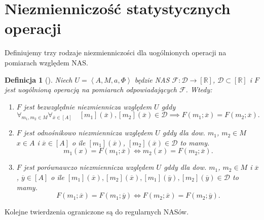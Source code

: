 \documentclass[12pt,a4paper]{report}
\newtheorem{definition}{Definicja}[chapter]
\newcommand{\domkniecie}[1]{\left[ {#1} \right] }
\newcommand{\tuple}[1]{\left\langle {#1} \right\rangle}
\begin{document}
\section{Niezmienniczość statystycznych operacji}
Definiujemy trzy rodzaje niezmienniczości dla uogólnionych operacji na pomiarach względem NAS. 
\begin{definition}[{\citep[Def. 5]{adams1965theory}}]
Niech $U=\tuple{A,M,a,\Phi}$ będzie NAS $\mathcal{F}:\mathcal{D}\to\domkniecie{\mathbb{R}}$, $\mathcal{D}\subset \domkniecie{\mathbb{R}}$ i $F$ jest uogólnioną operacją na pomiarach odpowiadających $\mathcal{F}$. Wtedy:
\begin{enumerate}
\item
$F$ jest bezwzględnie niezmiennicza względem $U$ gddy
$$
\forall_{m_{1}, m_{2} \in M}  \forall_{\overline{x} \in \domkniecie{A}} \quad \domkniecie{m_1}(\overline{x}), \domkniecie{m_2}(\overline{x})\in \mathcal{D} \implies F(m_{1};\overline{x})=F(m_{2};\overline{x}).
$$
\item
$F$ jest odnośnikowo niezmiennicza względem $U$ gddy dla dow. $m_{1}$, $m_{2} \in M$ $x \in A$ i  $\overline{x} \in \domkniecie{A}$ o ile  $\domkniecie{m_1}(\overline{x})$, $\domkniecie{m_2}(\overline{x})\in \mathcal{D}$ to mamy.
$$
 m_{1}(x)=F(m_{1};\overline{x}) \iff m_{2}(x)=F(m_{2};\overline{x}).
$$
\item
$F$ jest porównawczo niezmiennicza względem $U$ gddy dla dow. $m_1$, $m_2 \in M$ i $\overline{x}$, $\overline{y} \in \domkniecie{A}$ o ile $\domkniecie{m_1}(\overline{x}), \domkniecie{ m_2}(\overline{x}), \domkniecie{m_1}(\overline{y}), \domkniecie{m_2}(\overline{y}) \in \mathcal{D}$ to mamy.
$$
F(m_{1};\overline{x})=F(m_{1};\overline{y}) \iff F(m_{2};\overline{x})=F(m_{2};\overline{y}).
$$
\end{enumerate} 
\end{definition}

Kolejne twierdzenia ograniczone są do regularnych NASów.
\end{document}
